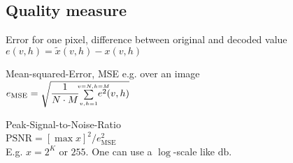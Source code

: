 \begin{compactdesc}
\section{Quality measure}
	\item[\lp{objective: PSNR}] 
		\begin{itemize*}[label=\colorbullet]
			\item Error for one pixel, difference between original and decoded value\\
				$e(v,h)=\tilde{x}(v,h)-x(v,h)$\\
		\item Mean-squared-Error, MSE e.g. over an image\\
			$\ds e_{\text{MSE}}=\sqrt{\frac{1}{N\cdot M}{\scriptstyle\sum\limits_{v,h=1}^{\mathclap{\quad v=N,h=M}}}e^2(v,h)}$
		\item Peak-Signal-to-Noise-Ratio\\
			$\text{PSNR}=[\max x]^2/e_{\text{MSE}}^{2}$\\
			E.g. $x=2^K$ or $255$. One can use a $\log$-scale like $\si{\decibel}$.
		\end{itemize*}
\end{compactdesc}

